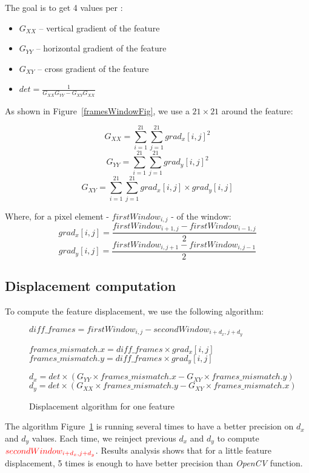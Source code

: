 The goal is to get 4 values per \feat{}:
\begin{itemize}
	\item $G_{XX}$ -- vertical gradient of the feature
	\item $G_{YY}$ -- horizontal gradient of the feature
	\item $G_{XY}$ -- cross gradient of the feature
	\item $det = \frac{1}{G_{XX}G_{YY}-G_{XY}G_{XX}}$
\end{itemize}

As shown in Figure~\ref{framesWindowFig}, we use a $21\times21$  around the feature:

$$G_{XX} = \sum_{i=1}^{21}\sum_{j=1}^{21} grad_{x}[i,j]^{2}$$
$$G_{YY} = \sum_{i=1}^{21}\sum_{j=1}^{21} grad_{y}[i,j]^{2}$$
$$G_{XY} = \sum_{i=1}^{21}\sum_{j=1}^{21} grad_{x}[i,j]\times grad_{y}[i,j]$$

Where, for a pixel element - $firstWindow_{i,j}$ -  of the window:
$$grad_{x}[i,j] = \frac{firstWindow_{i+1,j} - firstWindow_{i-1,j}}{2}$$
$$grad_{y}[i,j] = \frac{firstWindow_{i,j+1} - firstWindow_{i,j-1}}{2}$$


\subsection{Displacement computation}

To compute the feature displacement, we use the following algorithm:

\begin{figure}[!htbp]
\begin{algorithmic}

	\State $diff\_frames = firstWindow_{i,j} - secondWindow_{i+d_{x},j+d_{y}}$

	\State $frames\_mismatch.x = diff\_frames\times grad_{x}[i,j]$
	\State $frames\_mismatch.y = diff\_frames\times grad_{y}[i,j]$

	\EndFor

	\State $d_{x} = det\times (G_{YY}\times frames\_mismatch.x - G_{XY}\times frames\_mismatch.y)$
	\State $d_{y} = det\times (G_{XX}\times frames\_mismatch.y - G_{XY}\times frames\_mismatch.x)$
\end{algorithmic}
\caption{Displacement algorithm for one feature}
\label{algoFig}
\end{figure}
\FloatBarrier

The algorithm Figure~\ref{algoFig} is running several times to have a better precision on $d_{x}$ and $d_{y}$ values. Each time, we reinject previous $d_{x}$ and $d_{y}$ to compute $\textcolor{red}{secondWindow_{i+d_{x},j+d_{y}}}$. Results analysis shows that for a little feature displacement, 5 times is enough to have better precision than \emph{OpenCV} function.\\


